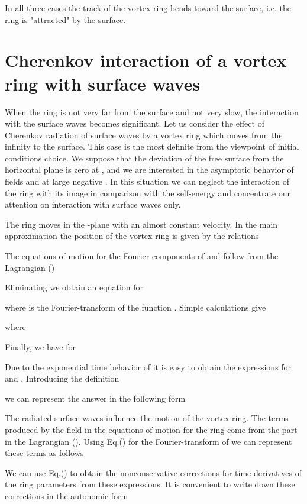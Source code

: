 In all three cases the track of the vortex ring bends toward the surface, 
i.e. the ring is "attracted" by the surface.

\section{Cherenkov interaction of a vortex ring with surface waves}

When the ring is not very far from the surface and not very slow, 
the interaction with the surface waves becomes significant. 
Let us consider the effect of Cherenkov radiation of surface waves 
by a vortex ring which moves from the infinity to the surface. 
This case is the most definite from the viewpoint of initial conditions choice.
We suppose that the deviation of the free surface from the horizontal plane 
 is zero at , and we are interested in the asymptotic 
behavior of fields  and  at large negative . 
In this situation we can neglect the interaction of the ring with its 
image in comparison with the self-energy 
and concentrate our attention on interaction with surface waves only.


The ring moves in the -plane with an
almost constant velocity. In the main approximation the position 
 of the vortex ring is given by the relations


The equations of motion for the Fourier-components of  and  follow
from the Lagrangian ()

Eliminating  we obtain an equation for 

where  is the Fourier-transform of the  function 
. Simple calculations give


where

Finally, we have for 

Due to the exponential time behavior of  
it is easy to obtain the expressions for 
 and  . Introducing the definition

we can represent the answer in the following form



The radiated surface waves influence the motion of the vortex ring. 
The terms produced by the field  in the equations of motion 
for the ring come from the part  
in the Lagrangian (). Using Eq.() for 
the Fourier-transform of  we can represent these terms as follows




We can use Eq.() to obtain  
the nonconservative corrections for time derivatives of the ring 
parameters from these expressions.
It is convenient to write down these corrections in the autonomic form





